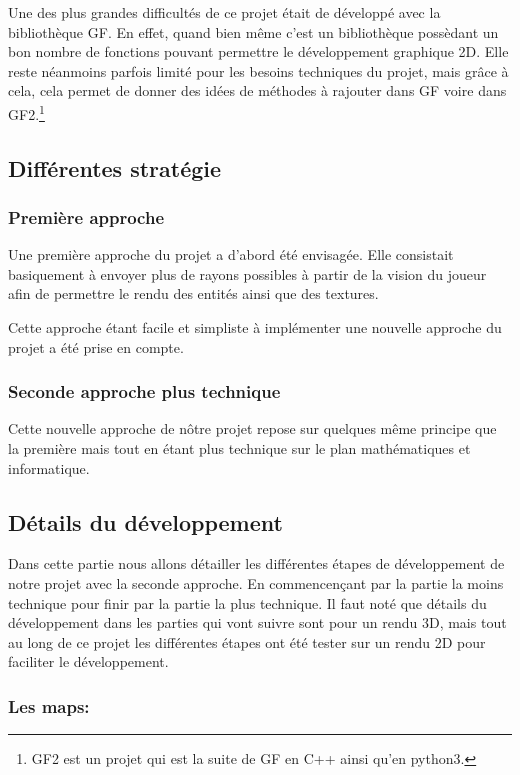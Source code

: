 \documentclass[12pt]{report}
\begin{document}
Une des plus grandes difficultés de ce projet était de développé avec la bibliothèque
GF. En effet, quand bien même c'est un bibliothèque possèdant un bon nombre de 
fonctions pouvant permettre le développement graphique 2D. Elle reste néanmoins
parfois limité pour les besoins techniques du projet, mais grâce à cela, cela permet
de donner des idées de méthodes à rajouter dans GF voire dans GF2.\footnote{GF2 est un projet
qui est la suite de GF en C++ ainsi qu'en python3.}


\subsection{Différentes stratégie}
\subsubsection{Première approche}

Une première approche du projet a d'abord été envisagée. Elle consistait 
basiquement à envoyer plus de rayons possibles à partir de la vision du joueur
afin de permettre le rendu des entités ainsi que des textures.

Cette approche étant facile et simpliste à implémenter une nouvelle approche
du projet a été prise en compte.

\subsubsection{Seconde approche plus technique}

Cette nouvelle approche de nôtre projet repose sur quelques même principe que
la première mais tout en étant plus technique sur le plan mathématiques et informatique.

\subsection{Détails du développement}

Dans cette partie nous allons détailler les différentes étapes de développement
de notre projet avec la seconde approche. En commencençant par la partie la 
moins technique pour finir par la partie la plus technique.
Il faut noté que détails du développement dans les parties qui vont suivre
sont pour un rendu 3D, mais tout au long de ce projet les différentes étapes
ont été tester sur un rendu 2D pour faciliter le développement.

\subsubsection{Les maps:}
\end{document}
